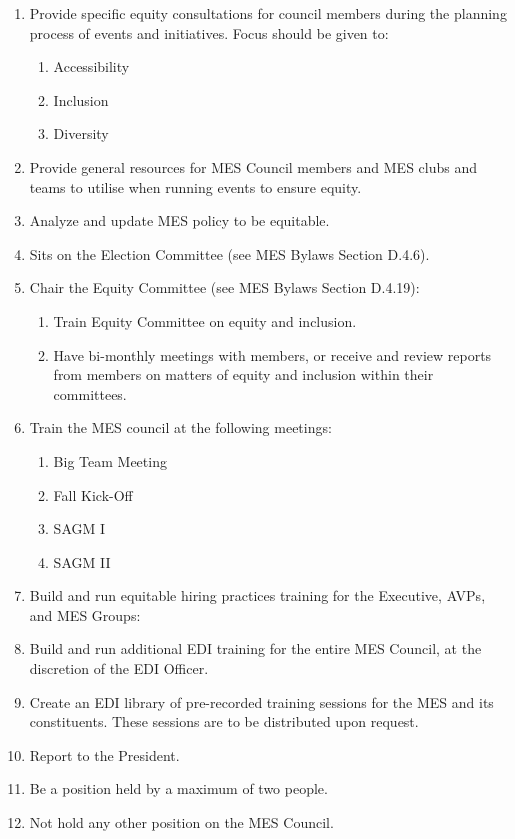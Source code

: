 \begin{enumerate}
 \item
  Provide specific equity consultations for council members during the
  planning process of events and initiatives. Focus should be given to:

  \begin{enumerate}
   \item
    Accessibility
   \item
    Inclusion
   \item
    Diversity
  \end{enumerate}
 \item
  Provide general resources for MES Council members and MES clubs and
  teams to utilise when running events to ensure equity.
 \item
  Analyze and update MES policy to be equitable.
 \item
  Sits on the Election Committee (see MES Bylaws Section D.4.6).
 \item
  Chair the Equity Committee (see MES Bylaws Section D.4.19):

  \begin{enumerate}
   \item
    Train Equity Committee on equity and inclusion.
   \item
    Have bi-monthly meetings with members, or receive and review reports
    from members on matters of equity and inclusion within their
    committees.
  \end{enumerate}
 \item
  Train the MES council at the following meetings:

  \begin{enumerate}
   \item
    Big Team Meeting
   \item
    Fall Kick-Off
   \item
    SAGM I
   \item
    SAGM II
  \end{enumerate}
 \item
  Build and run equitable hiring practices training for the Executive,
  AVPs, and MES Groups:
 \item
  Build and run additional EDI training for the entire MES Council, at
  the discretion of the EDI Officer.
 \item
  Create an EDI library of pre-recorded training sessions for the MES
  and its constituents. These sessions are to be distributed upon
  request.
 \item
  Report to the President.
 \item
  Be a position held by a maximum of two people.
 \item
  Not hold any other position on the MES Council.

\end{enumerate}

